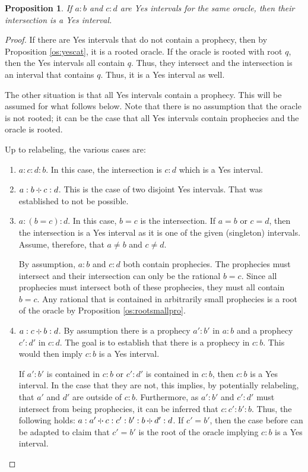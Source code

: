 \documentclass[12pt]{article}
\newtheorem{proposition}{Proposition}[section]
\begin{document}
   
\begin{proposition}
    If $ a:b$ and $c:d$ are Yes intervals for the same oracle, then their intersection is a Yes interval. 
\end{proposition}

\begin{proof}
    If there are Yes intervals that do not contain a prophecy, then by Proposition \ref{os:yescat}, it is a rooted oracle. If the oracle is rooted with root $q$, then the Yes intervals all contain $q$. Thus, they intersect and the intersection is an interval that contains $q$. Thus, it is a Yes interval as well. 

    The other situation is that all Yes intervals contain a prophecy. This will be assumed for what follows below. Note that there is no assumption that the oracle is not rooted; it can be the case that all Yes intervals contain prophecies and  the oracle is rooted. 

    Up to relabeling, the various cases are: 
    \begin{enumerate}
        \item $a:c:d:b$. In this case, the intersection is $c:d$ which is a Yes interval. 
        \item $a:b \betneq c:d$. This is the case of two disjoint Yes intervals. That was established to not be possible. 


        \item $a:(b=c):d$. In this case, $b=c$ is the intersection.  If $a=b$ or $c=d$, then the intersection is a Yes interval as it is one of the given (singleton) intervals. Assume, therefore, that $a \neq b$ and $c \neq d$. 
        
        By assumption, $a:b$ and $c:d$ both contain prophecies. The prophecies must intersect and their intersection can only be the rational $b=c$. Since all prophecies must intersect both of these prophecies, they must all contain $b=c$. Any rational that is  contained in arbitrarily small prophecies is a root of the oracle by Proposition \ref{os:rootsmallpro}.
        
        \item $a:c \betneq b:d$. By assumption there is a prophecy $a':b'$ in $a:b$ and a prophecy $c':d'$ in $c:d$. The goal is to establish that there is a prophecy in $c:b$. This would then imply $c:b$ is a Yes interval. 
        
        If $a':b'$ is contained in $c:b$ or $c':d'$ is contained in $c:b$, then $c:b$ is a Yes interval. In the case that they are not, this implies, by potentially relabeling, that $a'$ and $d'$ are outside of $c:b$. Furthermore, as  $a':b'$ and $c':d'$ must intersect from being prophecies, it can be inferred that $c:c':b':b$. Thus, the following holds:  $a:a' \betneq c:c':b':b \betneq d':d$. If $c'=b'$, then the case before can be adapted to claim that $c'=b'$ is the root of the oracle implying $c:b$ is a Yes interval. 


\end{enumerate}
\end{proof}
\end{document}
